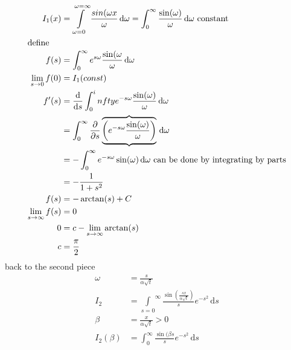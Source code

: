 \documentclass{article}
\begin{document}
\begin{align*}
  I_1(x)&=\int\limits_{\omega =0}^{\omega= \infty}{\frac{sin(\omega x}{\omega }\,\mathrm{d}\omega }=\int_0^\infty{\frac{\sin(\omega )}{\omega }\,\mathrm{d}\omega }\text{ constant}\\
  \intertext{define}
  f(s)&=\int_0^\infty{e^{s\omega }\frac{\sin(\omega }{\omega }\,\mathrm{d}\omega }\\
  \lim\limits_{s\to 0}f(0)&=I_1(const)\\
  f'(s)&=\frac{\mathrm{d}}{\mathrm{d}s}\int_0^infty{e^{-s\omega }\frac{\sin(\omega )}{\omega }\,\mathrm{d}\omega }\\
  &=\int_0^\infty{\frac{\partial}{\partial s}\underbrace{\overbrace{\left(e^{-s\omega }\frac{\sin(\omega )}{\omega }\right)}}\,\mathrm{d}\omega }\\
  &=-\int_0^\infty{e^{-s\omega }\sin(\omega )\,\mathrm{d}\omega }\text{ can be done by integrating by parts}\\
  &=-\frac{1}{1+s^2}\\
  f(s)&=-\arctan(s)+C\\
  \lim\limits_{s\to\infty}f(s)&=0\\
  0&=c-\lim\limits_{s\to\infty}\arctan(s)\\
  c&=\frac{\pi }{2}
\end{align*}
back to the second piece
\begin{align*}
  \omega &=\frac{s}{\alpha \sqrt{t}}\\
  I_2&={\int\limits_{s=0}}^\infty{\frac{\sin\left(\frac{sx}{\alpha \sqrt{t}}\right)}{s}e^{-s^2}\,\mathrm{d}s}\\
  \beta &=\frac{x}{\alpha \sqrt{t}}>0\\
  I_2(\beta )&=\int_0^\infty{\frac{\sin(\beta s}{s}e^{-s^2}\,\mathrm{d}s}
\end{align*}
\end{document}
